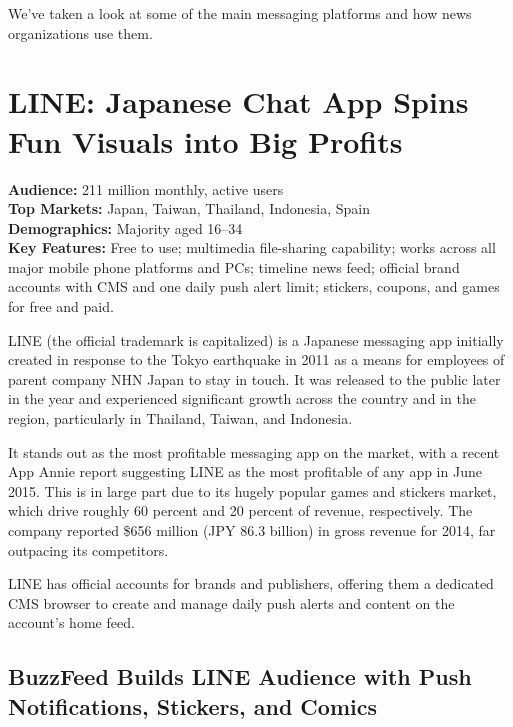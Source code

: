 \documentclass[notoc, symmetric, nobib, nols]{towcenter-guideto-book}
\begin{document}
We've taken a look at some of the main messaging platforms and how news organizations use them.

\section[LINE: Japanese Chat App Spins Fun Visuals into Big Profits]{LINE: Japanese Chat App Spins Fun Visuals \protect\newline into Big Profits}


\begin{framed}
  \noindent\textbf{Audience:} 211 million monthly, active users\\
  \noindent\textbf{Top Markets:} Japan, Taiwan, Thailand, Indonesia, Spain\\
  \noindent\textbf{Demographics:} Majority aged 16--34\\
  \noindent\textbf{Key Features:} Free to use; multimedia file-sharing capability; works across all major mobile phone platforms and PCs; timeline news feed; official brand accounts with CMS and one daily push alert limit; stickers, coupons, and games for free and paid.
\end{framed}

\vspace{\baselineskip}
LINE (the official trademark is capitalized) is a Japanese messaging app initially created in response to the Tokyo earthquake in 2011 as a means for employees of parent company NHN Japan to stay in touch. It was released to the public later in the year and experienced significant growth across the country and in the region, particularly in Thailand, Taiwan, and Indonesia. 

It stands out as the most profitable messaging app on the market, with a recent App Annie report suggesting LINE as the most profitable of any app in June 2015.\autocite{AppAnnie} This is in large part due to its hugely popular games and stickers market, which drive roughly 60 percent and 20 percent of revenue, respectively. The company reported \$656 million (JPY 86.3 billion) in gross revenue for 2014, far outpacing its competitors.\autocite{Line2014results} 

LINE has official accounts for brands and publishers, offering them a dedicated CMS browser to create and manage daily push alerts and content on the account's home feed.

\subsection{BuzzFeed Builds LINE Audience with Push Notifications, \protect\newline Stickers, and Comics}
\end{document}
